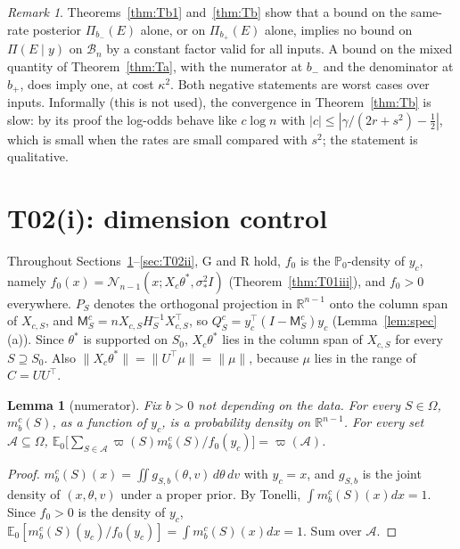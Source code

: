 \documentclass[11pt]{article}
\newtheorem{lemma}[theorem]{Lemma}
\theoremstyle{remark}
\newtheorem{remark}[theorem]{Remark}
\newcommand{\R}{\mathbb R}
\newcommand{\E}{\mathbb E}
\newcommand{\Prob}{\mathbb P}
\newcommand{\N}{\mathcal N}
\newcommand{\tr}{^{\top}}
\newcommand{\vp}{\varpi}
\newcommand{\Om}{\Omega}
\newcommand{\B}{\mathcal B}
\newcommand{\yc}{y_c}
\newcommand{\Xc}{X_c}
\newcommand{\bm}{b_-}
\newcommand{\bp}{b_+}
\begin{document}
\begin{remark}
Theorems~\ref{thm:Tb1} and~\ref{thm:Tb} show that a bound on the same-rate posterior $\Pi_{\bm}(E)$ alone, or on $\Pi_{\bp}(E)$ alone, implies no bound on $\Pi(E\mid y)$ on $\B_n$ by a constant factor valid for all inputs. A bound on the mixed quantity of Theorem~\ref{thm:Ta}, with the numerator at $\bm$ and the denominator at $\bp$, does imply one, at cost $\kappa^2$. Both negative statements are worst cases over inputs. Informally (this is not used), the convergence in Theorem~\ref{thm:Tb} is slow: by its proof the log-odds behave like $c\log n$ with $|c|\le|\gamma/(2r+s^2)-\frac12|$, which is small when the rates are small compared with $s^2$; the statement is qualitative.
\end{remark}

\section{T02(i): dimension control}\label{sec:T02i}

Throughout Sections~\ref{sec:T02i}--\ref{sec:T02ii}, G and R hold, $f_0$ is the $\Prob_0$-density of $\yc$, namely $f_0(x)=\N_{n-1}(x;\Xc\theta^*,\sigma_*^2I)$ (Theorem~\ref{thm:T01iii}), and $f_0>0$ everywhere. $P_S$ denotes the orthogonal projection in $\R^{n-1}$ onto the column span of $X_{c,S}$, and $\mathsf{M}^c_S=nX_{c,S}H_S^{-1}X_{c,S}\tr$, so $Q^c_S=\yc\tr(I-\mathsf{M}^c_S)\yc$ (Lemma~\ref{lem:spec}(a)). Since $\theta^*$ is supported on $S_0$, $\Xc\theta^*$ lies in the column span of $X_{c,S}$ for every $S\supseteq S_0$. Also $\|\Xc\theta^*\|=\|U\tr\mu\|=\|\mu\|$, because $\mu$ lies in the range of $C=UU\tr$.

\begin{lemma}[numerator]\label{lem:num}
Fix $b>0$ not depending on the data. For every $S\in\Om$, $m^c_b(S)$, as a function of $\yc$, is a probability density on $\R^{n-1}$. For every set $\mathcal A\subseteq\Om$, $\E_0\big[\sum_{S\in\mathcal A}\vp(S)m^c_b(S)/f_0(\yc)\big]=\vp(\mathcal A)$.
\end{lemma}
\begin{proof}
$m^c_b(S)(x)=\iint g_{S,b}(\theta,v)\,d\theta\,dv$ with $\yc=x$, and $g_{S,b}$ is the joint density of $(x,\theta,v)$ under a proper prior. By Tonelli, $\int m^c_b(S)(x)dx=1$. Since $f_0>0$ is the density of $\yc$, $\E_0[m^c_b(S)(\yc)/f_0(\yc)]=\int m^c_b(S)(x)dx=1$. Sum over $\mathcal A$.
\end{proof}
\end{document}
